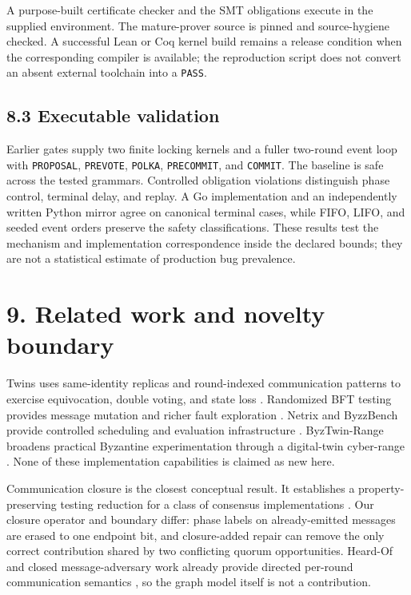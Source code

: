 A purpose-built certificate checker and the SMT obligations execute in
the supplied environment. The mature-prover source is pinned and
source-hygiene checked. A successful Lean or Coq kernel build remains a
release condition when the corresponding compiler is available; the
reproduction script does not convert an absent external toolchain into a
\texttt{PASS}.

\subsection{8.3 Executable validation}\label{executable-validation}

Earlier gates supply two finite locking kernels and a fuller two-round
event loop with \texttt{PROPOSAL}, \texttt{PREVOTE}, \texttt{POLKA},
\texttt{PRECOMMIT}, and \texttt{COMMIT}. The baseline is safe across the
tested grammars. Controlled obligation violations distinguish phase
control, terminal delay, and replay. A Go implementation and an
independently written Python mirror agree on canonical terminal cases,
while FIFO, LIFO, and seeded event orders preserve the safety
classifications. These results test the mechanism and implementation
correspondence inside the declared bounds; they are not a statistical
estimate of production bug prevalence.

\section{9. Related work and novelty
boundary}\label{related-work-and-novelty-boundary}

Twins uses same-identity replicas and round-indexed communication
patterns to exercise equivocation, double voting, and state loss
\cite{bano2021twins}. Randomized BFT testing provides message mutation
and richer fault exploration \cite{winter2023randomized}. Netrix and
ByzzBench provide controlled scheduling and evaluation infrastructure
\cite{dragoi2024netrix,louroneto2025byzzbench}. ByzTwin-Range broadens
practical Byzantine experimentation through a digital-twin cyber-range
\cite{freitas2026byztwin}. None of these implementation capabilities is
claimed as new here.

Communication closure is the closest conceptual result. It establishes a
property-preserving testing reduction for a class of consensus
implementations \cite{dragoi2020communication}. Our closure operator and
boundary differ: phase labels on already-emitted messages are erased to
one endpoint bit, and closure-added repair can remove the only correct
contribution shared by two conflicting quorum opportunities. Heard-Of
and closed message-adversary work already provide directed per-round
communication semantics \cite{charronbost2009heardof,winkler2020closed},
so the graph model itself is not a contribution.

